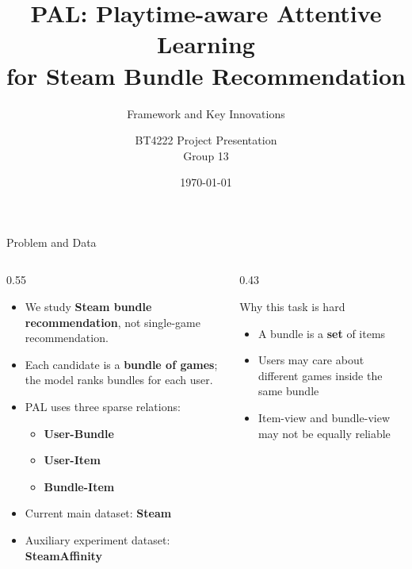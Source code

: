 \documentclass[aspectratio=169]{beamer}
\title{PAL: Playtime-aware Attentive Learning\\for Steam Bundle Recommendation}
\subtitle{Framework and Key Innovations}
\author{BT4222 Project Presentation\\Group 13}
\date{\today}
\begin{document}
\begin{frame}
  \titlepage
\end{frame}

\begin{frame}{Problem and Data}
  \begin{columns}[T]
    \begin{column}{0.55\textwidth}
      \begin{itemize}
        \item We study \textbf{Steam bundle recommendation}, not single-game recommendation.
        \item Each candidate is a \textbf{bundle of games}; the model ranks bundles for each user.
        \item PAL uses three sparse relations:
        \begin{itemize}
          \item \textbf{User-Bundle}
          \item \textbf{User-Item}
          \item \textbf{Bundle-Item}
        \end{itemize}
        \item Current main dataset: \textbf{Steam}
        \item Auxiliary experiment dataset: \textbf{SteamAffinity}
      \end{itemize}
    \end{column}
    \begin{column}{0.43\textwidth}
      \begin{block}{Why this task is hard}
        \begin{itemize}
          \item A bundle is a \textbf{set} of items
          \item Users may care about different games inside the same bundle
          \item Item-view and bundle-view may not be equally reliable
        \end{itemize}
      \end{block}
    \end{column}
  \end{columns}
\end{frame}
\end{document}
